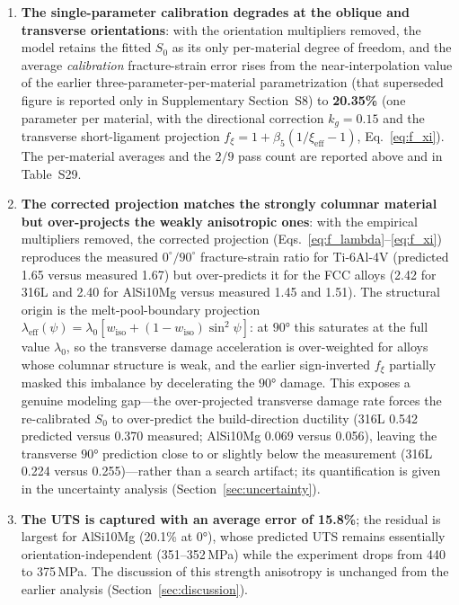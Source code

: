 \begin{enumerate}\def\labelenumi{(\arabic{enumi})}
    \item \textbf{The single-parameter calibration degrades at the oblique and transverse orientations}: with the orientation multipliers removed, the model retains the fitted $S_0$ as its only per-material degree of freedom, and the average \emph{calibration} fracture-strain error rises from the near-interpolation value of the earlier three-parameter-per-material parametrization (that superseded figure is reported only in Supplementary Section~S8) to \textbf{20.35\%} (one parameter per material, with the directional correction $k_g=0.15$ and the transverse short-ligament projection $f_\xi = 1+\beta_5(1/\xi_\mathrm{eff}-1)$, Eq.~\eqref{eq:f_xi}). The per-material averages and the $2/9$ pass count are reported above and in Table~S29.
    \item \textbf{The corrected projection matches the strongly columnar material but over-projects the weakly anisotropic ones}: with the empirical multipliers removed, the corrected projection (Eqs.~\eqref{eq:f_lambda}--\eqref{eq:f_xi}) reproduces the measured $0^\circ/90^\circ$ fracture-strain ratio for Ti-6Al-4V (predicted 1.65 versus measured 1.67) but over-predicts it for the FCC alloys (2.42 for 316L and 2.40 for AlSi10Mg versus measured 1.45 and 1.51). The structural origin is the melt-pool-boundary projection $\lambda_{\mathrm{eff}}(\psi) = \lambda_0 [w_{\mathrm{iso}} + (1-w_{\mathrm{iso}})\sin^2\psi]$: at $\ang{90}$ this saturates at the full value $\lambda_0$, so the transverse damage acceleration is over-weighted for alloys whose columnar structure is weak, and the earlier sign-inverted $f_\xi$ partially masked this imbalance by decelerating the $\ang{90}$ damage. This exposes a genuine modeling gap---the over-projected transverse damage rate forces the re-calibrated $S_0$ to over-predict the build-direction ductility (316L 0.542 predicted versus 0.370 measured; AlSi10Mg 0.069 versus 0.056), leaving the transverse $\ang{90}$ prediction close to or slightly below the measurement (316L 0.224 versus 0.255)---rather than a search artifact; its quantification is given in the uncertainty analysis (Section~\ref{sec:uncertainty}).
    \item \textbf{The UTS is captured with an average error of 15.8\%}; the residual is largest for AlSi10Mg (20.1\% at $\ang{0}$), whose predicted UTS remains essentially orientation-independent (351--352\,MPa) while the experiment drops from 440 to 375\,MPa. The discussion of this strength anisotropy is unchanged from the earlier analysis (Section~\ref{sec:discussion}).
\end{enumerate}

